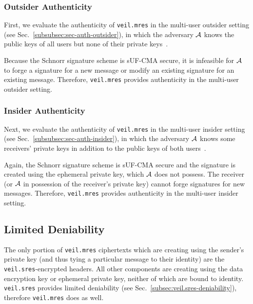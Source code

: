 \subsubsection{Outsider Authenticity}

First, we evaluate the authenticity of \texttt{veil.mres} in the multi-user outsider setting (see
Sec.~\ref{subsubsec:sec-auth-outsider}), in which the adversary $\mathcal{A}$ knows the public keys
of all users but none of their private keys~\cite[p. 47]{baek2010}\@.

Because the Schnorr signature scheme is sUF-CMA secure, it is infeasible for $\mathcal{A}$ to forge a
signature for a new message or modify an existing signature for an existing message.
Therefore, \texttt{veil.mres} provides authenticity in the multi-user outsider setting.

\subsubsection{Insider Authenticity}

Next, we evaluate the authenticity of \texttt{veil.mres} in the multi-user insider setting (see
Sec.~\ref{subsubsec:sec-auth-insider}), in which the adversary $\mathcal{A}$ knows some receivers'
private keys in addition to the public keys of both users~\cite[p. 48]{baek2010}\@.

Again, the Schnorr signature scheme is sUF-CMA secure and the signature is created using the
ephemeral private key, which $\mathcal{A}$ does not possess.
The receiver (or $\mathcal{A}$ in possession of the receiver's private key) cannot forge signatures
for new messages. Therefore, \texttt{veil.mres} provides authenticity in the multi-user insider
setting.

\subsection{Limited Deniability}\label{subsec:veil.mres-deniability}

The only portion of \texttt{veil.mres} ciphertexts which are creating using the sender's private key
\@(and thus tying a particular message to their identity) are the \texttt{veil.sres}-encrypted
headers.
All other components are creating using the data encryption key or ephemeral private key, neither of
which are bound to identity.
\texttt{veil.sres} provides limited deniability (see Sec.~\ref{subsec:veil.sres-deniability}),
therefore \texttt{veil.mres} does as well.

